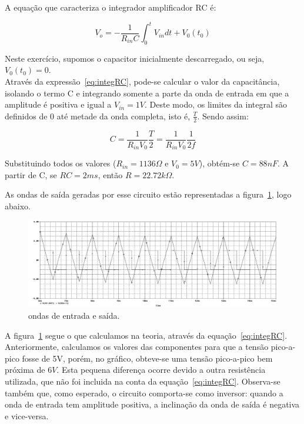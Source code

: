 \documentclass[12pt, a4paper]{article}
\begin{document}
\begin{enumerate}
            A equação que caracteriza o integrador amplificador RC é:
            
            \begin{equation} \label{eq:integRC}
                V_o = -\frac{1}{R_{in}C}\int_0^{t}V_{in}dt + V_0(t_0)
            \end{equation}
            
            Neste exercício, supomos o capacitor inicialmente descarregado, ou seja, \(V_0(t_0)=0\). \\ Através da expressão~\ref{eq:integRC}, pode-se calcular o valor da capacitância, isolando o termo C e integrando somente a parte da onda de entrada em que a amplitude é positiva e igual a \(V_{in} = 1V\). Deste modo, os limites da integral são definidos de 0 até metade da onda completa, isto é, \(\frac{T}{2}\). Sendo assim:
            
            \[C = \frac{1}{R_{in}V_0}\frac{T}{2} = \frac{1}{R_{in}V_0}\frac{1}{2f}\]
            
            Substituindo todos os valores (\(R_{in}=1136\Omega\) e \(V_0=5V\)), obtém-se \(C=88nF\). A partir de C, se \(RC=2ms\), então \(R = 22.72k\Omega\).
            
            As ondas de saída geradas por esse circuito estão representadas a figura~\ref{waves4}, logo abaixo. \\
            
            \begin{figure}[H] 
                \centering
                \includegraphics[width=1\textwidth]{waves4}
                \caption{ondas de entrada e saída.}        
                \label{waves4}
            \end{figure}
            
            A figura~\ref{waves4} segue o que calculamos na teoria, através da equação~\ref{eq:integRC}. Anteriormente, calculamos os valores das componentes para que a tensão pico-a-pico fosse de 5V, porém, no gráfico, obteve-se uma tensão pico-a-pico bem próxima de \(6V\). Esta pequena diferença ocorre devido a outra resistência utilizada, que não foi incluida na conta da equação~\ref{eq:integRC}. Observa-se também que, como esperado, o circuito comporta-se como inversor: quando a onda de entrada tem amplitude positiva, a inclinação da onda de saída é negativa e vice-versa.
            

\end{enumerate}
\end{document}
